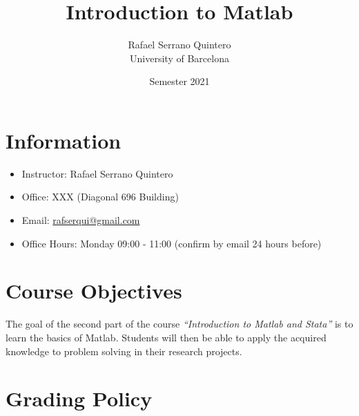\documentclass[a4paper,12pt]{article}
\begin{document}

\title{\textbf{Introduction to Matlab}}
\author{Rafael Serrano Quintero \\
University of Barcelona}
\date{ Semester 2021}

\maketitle

\section{Information}

\begin{itemize}
    \item Instructor: Rafael Serrano Quintero
    \item Office: XXX (Diagonal 696 Building)
    \item Email: \href{mailto:rafserqui@gmail.com}{rafserqui@gmail.com}
    \item Office Hours: Monday 09:00 - 11:00 (confirm by email 24 hours before)
\end{itemize}

\section{Course Objectives}

The goal of the second part of the course \textit{``Introduction to Matlab and Stata''} is to learn the basics of Matlab. Students will then be able to apply the acquired knowledge to problem solving in their research projects.

\section{Grading Policy}
\end{document}
